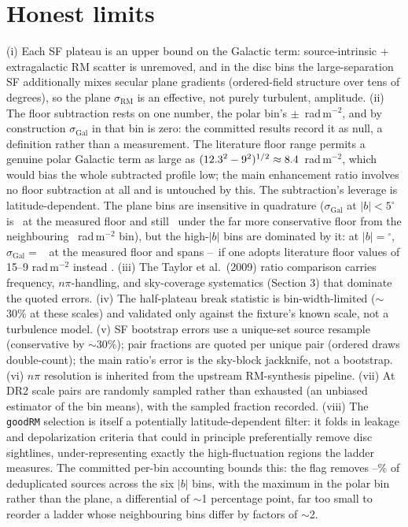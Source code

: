 \documentclass[twocolumn]{aastex631}
\newcommand{\code}[1]{\texttt{#1}}
\begin{document}
\section{Honest limits}
(i) Each SF plateau is an upper bound on the Galactic term: source-intrinsic + extragalactic RM
scatter is unremoved, and in the disc bins the large-separation SF additionally mixes secular
plane gradients (ordered-field structure over tens of degrees), so the plane
$\sigma_\mathrm{RM}$ is an effective, not purely turbulent, amplitude. (ii) The floor
subtraction rests on one number, the polar bin's \rmsRealFloorSig$\pm$\rmsRealFloorSigJkErr\
rad\,m$^{-2}$, and by construction $\sigma_\mathrm{Gal}$ in that bin is zero: the committed
results record it as null, a definition rather than a measurement. The literature floor range
permits a genuine polar Galactic term as large as
$({12.3}^2-9^2)^{1/2}\approx8.4$~rad\,m$^{-2}$, which would bias the whole
subtracted profile low; the main enhancement ratio involves no floor subtraction at all and
is untouched by this. The subtraction's leverage is latitude-dependent. The plane bins are
insensitive in
quadrature ($\sigma_\mathrm{Gal}$ at $|b|<5^\circ$ is \rmsRealSigGalPlane\ at the measured floor
and still \rmsRealSigGalPlaneAltFloor\ under the far more conservative floor from the
neighbouring \rmsRealAltFloorSig~rad\,m$^{-2}$ bin), but the high-$|b|$ bins are dominated by
it: at $|b|=$\rmsRealSigGalMidBin$^\circ$, $\sigma_\mathrm{Gal}=$ \rmsRealSigGalMid\ at the
measured floor and spans \rmsRealSigGalMidFloorLitHi--\rmsRealSigGalMidFloorLitLo\ if one adopts
literature floor values of 15--9 rad\,m$^{-2}$ instead \citep{mao2010}. (iii) The Taylor et al.\ (2009) ratio comparison
carries frequency, $n\pi$-handling, and sky-coverage systematics (Section 3) that dominate the
quoted errors. (iv) The half-plateau break statistic is bin-width-limited ($\sim$30\% at
these scales) and validated only against the fixture's known scale, not a turbulence model.
(v) SF bootstrap errors use a unique-set source resample (conservative by $\sim$30\%); pair
fractions are quoted per unique pair (ordered draws double-count); the main ratio's error
is the sky-block jackknife, not a bootstrap. (vi) $n\pi$ resolution is inherited from the
upstream RM-synthesis pipeline. (vii) At DR2 scale pairs are randomly sampled rather than
exhausted (an unbiased estimator of the bin means), with the sampled fraction recorded.
(viii) The \code{goodRM} selection is itself a potentially latitude-dependent filter: it folds
in leakage and depolarization criteria that could in principle preferentially remove disc
sightlines, under-representing exactly the high-fluctuation regions the ladder measures. The
committed per-bin accounting bounds this: the flag removes
\rmsRealFlagRemPctMin--\rmsRealFlagRemPctMax\% of deduplicated sources across the six $|b|$
bins, with the maximum in the polar bin rather than the plane, a differential of
$\sim$1 percentage point, far too small to reorder a ladder whose neighbouring bins differ by
factors of $\sim$2.
\end{document}

